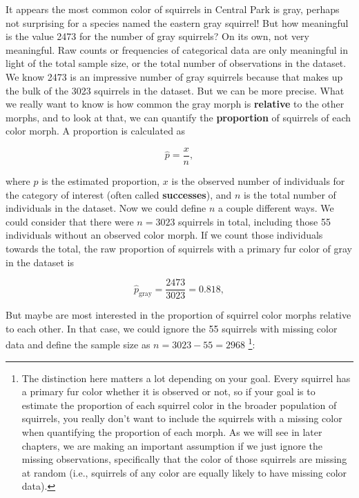 \documentclass[
]{book}
\newenvironment{Shaded}{\begin{snugshade}}{\end{snugshade}}
\newcommand{\AttributeTok}[1]{\textcolor[rgb]{0.13,0.29,0.53}{#1}}
\newcommand{\CommentTok}[1]{\textcolor[rgb]{0.56,0.35,0.01}{\textit{#1}}}
\newcommand{\ConstantTok}[1]{\textcolor[rgb]{0.56,0.35,0.01}{#1}}
\newcommand{\DecValTok}[1]{\textcolor[rgb]{0.00,0.00,0.81}{#1}}
\newcommand{\ErrorTok}[1]{\textcolor[rgb]{0.64,0.00,0.00}{\textbf{#1}}}
\newcommand{\FunctionTok}[1]{\textcolor[rgb]{0.13,0.29,0.53}{\textbf{#1}}}
\newcommand{\NormalTok}[1]{#1}
\newcommand{\SpecialCharTok}[1]{\textcolor[rgb]{0.81,0.36,0.00}{\textbf{#1}}}
\newcommand{\StringTok}[1]{\textcolor[rgb]{0.31,0.60,0.02}{#1}}
\begin{document}
\begin{Shaded}
\end{Shaded}

It appears the most common color of squirrels in Central Park is gray, perhaps not surprising for a species named the eastern gray squirrel! But how meaningful is the value 2473 for the number of gray squirrels? On its own, not very meaningful. Raw counts or frequencies of categorical data are only meaningful in light of the total sample size, or the total number of observations in the dataset. We know 2473 is an impressive number of gray squirrels because that makes up the bulk of the 3023 squirrels in the dataset. But we can be more precise. What we really want to know is how common the gray morph is \textbf{relative} to the other morphs, and to look at that, we can quantify the \textbf{proportion} of squirrels of each color morph. A proportion is calculated as

\[
\hat{p} = \frac{x}{n},
\]

where \(\hat{p}\) is the estimated proportion, \(x\) is the observed number of individuals for the category of interest (often called \textbf{successes}), and \(n\) is the total number of individuals in the dataset. Now we could define \(n\) a couple different ways. We could consider that there were \(n = 3023\) squirrels in total, including those 55 individuals without an observed color morph. If we count those individuals towards the total, the raw proportion of squirrels with a primary fur color of gray in the dataset is

\[
\hat{p}_{\text{gray}} = \frac{2473}{3023} = 0.818,
\]

But maybe are most interested in the proportion of squirrel color morphs relative to each other. In that case, we could ignore the 55 squirrels with missing color data and define the sample size as \(n = 3023 - 55 = 2968\) \footnote{The distinction here matters a lot depending on your goal. Every squirrel has a primary fur color whether it is observed or not, so if your goal is to estimate the proportion of each squirrel color in the broader population of squirrels, you really don't want to include the squirrels with a missing color when quantifying the proportion of each morph. As we will see in later chapters, we are making an important assumption if we just ignore the missing observations, specifically that the color of those squirrels are missing at random (i.e., squirrels of any color are equally likely to have missing color data).}:
\end{document}
